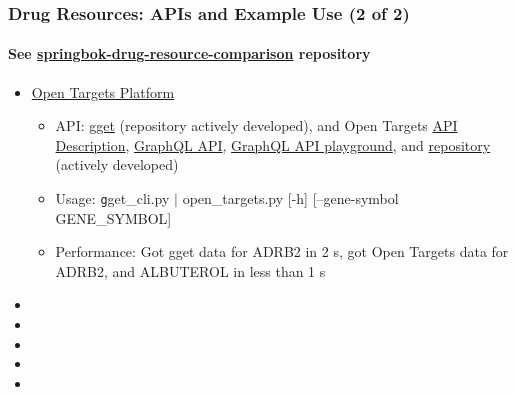 \documentclass[aspectratio=169,xcolor=dvipsnames]{beamer}
\begin{document}
\begin{frame}
  \frametitle{Drug Resources: APIs and Example Use (2 of 2)}
  \framesubtitle{See
    \href{https://github.com/ralatsdc/springbok-drug-resource-comparison}{springbok-drug-resource-comparison}
    repository}
  \begin{itemize}
  \item[]
    \href{https://platform-docs.opentargets.org/getting-started}{Open
      Targets Platform}
    \begin{itemize}
    \item API: \href{https://github.com/pachterlab/gget}{gget}
      (repository actively developed), and Open Targets
      \href{https://platform.opentargets.org/api}{API Description},
      \href{https://platform-docs.opentargets.org/data-access/graphql-api}{GraphQL
        API},
      \href{https://api.platform.opentargets.org/api/v4/graphql/browser}{GraphQL
        API playground}, and
      \href{https://github.com/opentargets/platform-api}{repository}
      (actively developed)
    \item Usage: {\texttt gget\_cli.py $|$ open\_targets.py [-h] [--gene-symbol GENE\_SYMBOL]}
    \item Performance: Got gget data for ADRB2 in 2 s, got Open
      Targets data for ADRB2, and ALBUTEROL in less than 1 s
    \end{itemize}
  \item[]
  \item[]
  \item[]
  \item[]
  \item[]
  \end{itemize}
\end{frame}
\end{document}

